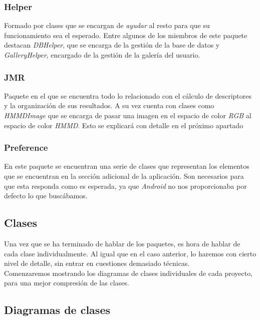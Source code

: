 \subsubsection{Helper}

Formado por clases que se encargan de \textit{ayudar} al resto para que su funcionamiento sea el esperado. Entre algunos de los miembros de este paquete destacan \textit{DBHelper}, que se encarga de la gestión de la base de datos y \textit{GalleryHelper}, encargado de la gestión de la galería del usuario.

\subsubsection{JMR}

Paquete en el que se encuentra todo lo relacionado con el cálculo de descriptores y la organización de sus resultados. A su vez cuenta con clases como \textit{HMMDImage} que se encarga de pasar una imagen en el espacio de color \textit{RGB} al espacio de color \textit{HMMD}. Esto se explicará con detalle en el próximo apartado

\subsubsection{Preference}

En este paquete se encuentran una serie de clases que representan los elementos que se encuentran en la sección adicional de la aplicación. Son necesarios para que esta responda como es esperada, ya que \textit{Android} no nos proporcionaba por defecto lo que buscábamos.

\subsection{Clases}

Una vez que se ha terminado de hablar de los paquetes, es hora de hablar de cada clase individualmente. Al igual que en el caso anterior, lo haremos con cierto nivel de detalle, sin entrar en cuestiones demasiado técnicas.\\

Comenzaremos mostrando los diagramas de clases individuales de cada proyecto, para una mejor compresión de las clases.\\

\subsection{Diagramas de clases}

